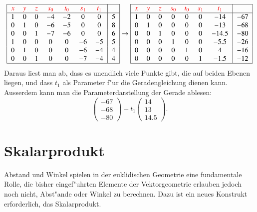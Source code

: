 \[
\begin{tabular}{|>{$}c<{$}>{$}c<{$}>{$}c<{$}>{$}c<{$}>{$}c<{$}>{$}c<{$}>{$}c<{$}|>{$}c<{$}|}
\hline
{\color{red}x}&
{\color{red}y}&
{\color{red}z}&
{\color{red}s_0}&
{\color{red}t_0}&
{\color{red}s_1}&
{\color{red}t_1}&\\
\hline
1&0&0&-4&-2& 0& 0&5\\
0&1&0&-6&-5& 0& 0&8\\
0&0&1&-7&-6& 0& 0&6\\
1&0&0& 0& 0&-6&-5&5\\
0&1&0& 0& 0&-6&-4&4\\
0&0&1& 0& 0&-7&-4&4\\
\hline
\end{tabular}
\rightarrow
\begin{tabular}{|>{$}c<{$}>{$}c<{$}>{$}c<{$}>{$}c<{$}>{$}c<{$}>{$}c<{$}>{$}c<{$}|>{$}c<{$}|}
\hline
{\color{red}x}&
{\color{red}y}&
{\color{red}z}&
{\color{red}s_0}&
{\color{red}t_0}&
{\color{red}s_1}&
{\color{red}t_1}&\\
\hline
1&0&0&0&0&0&-14 &-67\\
0&1&0&0&0&0&-13 &-68\\
0&0&1&0&0&0&-14.5&-80\\
0&0&0&1&0&0&-5.5&-26\\
0&0&0&0&1&0&4&-16\\
0&0&0&0&0&1&-1.5&-12\\
\hline
\end{tabular}
\]
Daraus liest man ab, dass es unendlich viele Punkte gibt, die auf beiden
Ebenen liegen, und dass $t_1$ als Parameter f"ur die Geradengleichung
dienen kann. Ausserdem kann man die Parameterdarstellung der Gerade ablesen:
\[
\begin{pmatrix}-67\\-68\\-80\end{pmatrix}
+t_1
\begin{pmatrix}14\\13\\14.5\end{pmatrix}.
\]
\section{Skalarprodukt}
Abstand und Winkel spielen in der euklidischen Geometrie eine fundamentale
Rolle, die bisher eingef"uhrten Elemente der Vektorgeometrie erlauben
jedoch noch nicht, Abst"ande oder Winkel zu berechnen. Dazu ist ein neues
Konstrukt erforderlich, das Skalarprodukt.

